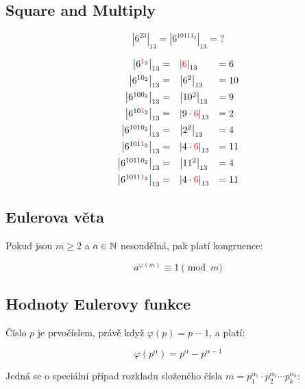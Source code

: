 \subsection{Square and Multiply}

\[
    \left| 6^{23} \right|_{13} = \left| 6^{10111_2} \right|_{13} = \text{?}
\]

\[
    \begin{array}{rll}
        \left| 6^{{\color{red}1}_2} \right|_{13} =     & \left| {\color{red}6} \right|_{13}         & = 6  \\[1.8mm]
        \left| 6^{10_2} \right|_{13} =                 & \left| 6^{2} \right|_{13}                  & = 10 \\[1.8mm]
        \left| 6^{100_2} \right|_{13} =                & \left| 10^2 \right|_{13}                   & = 9  \\[1.8mm]
        \left| 6^{10{\color{red}1}_2} \right|_{13} =   & \left| 9 \cdot {\color{red}6} \right|_{13} & = 2  \\[1.8mm]
        \left| 6^{1010_2} \right|_{13} =               & \left| 2^2 \right|_{13}                    & = 4  \\[1.8mm]
        \left| 6^{101{\color{red}1}_2} \right|_{13} =  & \left| 4 \cdot {\color{red}6} \right|_{13} & = 11 \\[1.8mm]
        \left| 6^{10110_2} \right|_{13} =              & \left| 11^2 \right|_{13}                   & = 4  \\[1.8mm]
        \left| 6^{1011{\color{red}1}_2} \right|_{13} = & \left| 4 \cdot {\color{red}6} \right|_{13} & = 11
    \end{array}
\]

\subsection{Eulerova věta}

Pokud jsou $m \ge 2$ a $a \in \mathbb{N}$ nesoudělná, pak platí kongruence:

\[
    a^{\varphi(m)} \equiv 1 \pmod{m}
\]

\subsection{Hodnoty Eulerovy funkce}

Číslo $p$ je prvočíslem, právě když $\varphi(p) = p - 1$, a platí:

\[
    \varphi(p^\alpha) = p^\alpha - p^{\alpha-1}
\]

Jedná se o speciální případ rozkladu složeného čísla $m = p_1^{\alpha_1} \cdot p_2^{\alpha_2} \cdots p_k^{\alpha_k}$:

